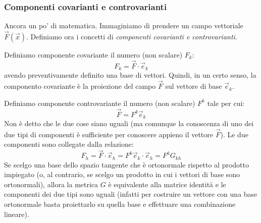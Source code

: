 \documentclass[a4paper,openany]{article}
\begin{document}
	\subsubsection{Componenti covarianti e controvarianti}
	Ancora un po' di matematica. Immaginiamo di prendere un campo vettoriale $\vec{F}(\vec{x})$. Definiamo ora i concetti di \textit{componenti covarianti e controvarianti}.
	
	Definiamo componente covariante il numero (non scalare) $F_{k}$:
	\begin{equation}
		F_{k} = \vec{F} \cdot \vec{e}_{k}
	\end{equation}
	avendo preventivamente definito una base di vettori. Quindi, in un certo senso, la componento covariante è la proiezione del campo $\vec{F}$ sul vettore di base $\vec{e}_{k}$.
	
	Definiamo componente controvariante il numero (non scalare) $F^{k}$ tale per cui:
	\begin{equation}
		\vec{F} = F^{k}\vec{e}_{k}
	\end{equation}
	Non è detto che le due cose siano uguali (ma comunque la conoscenza di uno dei due tipi di componenti è sufficiente per conoscere appieno il vettore $\vec{F}$). Le due componenti sono collegate dalla relazione:
	\begin{equation}
		F_{h} = \vec{F}\cdot\vec{e}_{h} = F^{k}\vec{e}_{k}\cdot\vec{e}_{h} = F^{k}G_{kh}
	\end{equation}
	Se scelgo una base dello spazio tangente che è ortonormale rispetto al prodotto impiegato (o, al contrario, se scelgo un prodotto in cui i vettori di base sono ortonormali), allora la metrica $G$ è equivalente alla matrice identità e le componenti dei due tipi sono uguali (infatti per costruire un vettore con una base ortonormale basta proiettarlo su quella base e effettuare una combinazione lineare).
\end{document}
